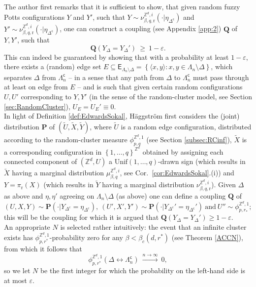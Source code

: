 \documentclass[12pt]{article}
\newcommand{\E}{\mathsf{E}}
\newcommand{\PP}{\mathbf{P}}
\newcommand{\Q}{\mathbf{Q}}
\renewcommand{\r}{\mathrm{r}}
\newcommand{\Z}{\mathbb{Z}}
\newcommand{\set}[1]{\left\{#1\right\}}
\newcommand{\ra}{\rightarrow}
\newcommand{\pika}{\boldsymbol{\cdot}}
\newcommand{\1}{\mathbbm{1}}
\renewcommand{\sp}[1]{\langle #1\rangle}
\renewcommand{\c}{\mathsf{c}}
\newcommand{\5}{\vspace{0.5cm}}
\renewcommand{\tilde}{\widetilde}
\theoremstyle{definition}
\begin{document}
The author first remarks that it is sufficient to show, that given random fuzzy Potts configurations $Y$ and $Y'$, such that $Y\sim\nu_{\beta,q,\r}^{\Z^d,i}(\pika|\eta_{\Delta^\c})$ and $Y'\sim\nu_{\beta,q,\r}^{\Z^d,i}(\pika|\eta_{\Delta^\c})$, one can construct a coupling (see Appendix \ref{app:2}) $\Q$ of $Y,Y'$, such that
$$\Q(Y_{\Delta}=Y_{\Delta}') ~\geq~ 1-\varepsilon.$$
This can indeed be guaranteed by showing that with a probability at least $1-\varepsilon$, there exists a (random) edge set $E\subseteq\E_{\Lambda_n\setminus\Delta}=\set{\sp{x,y}:x,y\in\Lambda_n\setminus\Delta}$, which separates $\Delta$ from $\Lambda_n^\c$ -- in a sense that any path from $\Delta$ to $\Lambda_n^\c$ must pass through at least on edge from $E$ -- and is such that given certain random configurations $U,U'$ corresponding to $Y,Y'$ (in the sense of the random-cluster model, see Section \ref{sec:RandomCluster}), $U_E=U_E'\equiv 0$. \\

In light of Definition \ref{def:EdwardsSokal}, H\"aggstr\"om first considers the (joint) distribution $\PP$ of $(\tilde{U},\tilde{X},\tilde{Y})$, where $\tilde{U}$ is a random edge configuration, distributed according to the random-cluster measure $\phi_{p,q}^{\Z^d,1}$ (see Section \ref{subsec:RCinf}), $\tilde{X}$ is a corresponding configuration in $\set{1,\ldots,q}^{\Z^d}$ obtained by assigning each connected component of $(\Z^d,U)$ a $\mathrm{Unif}(1,\ldots,q)$-drawn sign (which results in $\tilde{X}$ having a marginal distribution $\mu_{\beta,q}^{\Z^d, i}$, see Cor.~\ref{cor:EdwardsSokal}.(i)) and $Y=\pi_\r(X)$ (which results in $\tilde{Y}$ having a marginal distribution $\nu_{\beta,q,\r}^{\Z^d,i}$). Given $\Delta$ as above and $\eta,\eta'$ agreeing on $\Lambda_n\setminus\Delta$ (as above) one can define a coupling $\Q$ of 
$$(U,X,Y)\sim\PP(\pika|Y_{\Delta^c}=\eta_{\Delta^c}),~(U',X',Y')\sim\PP(\pika|Y_{\Delta^c}'=\eta_{\Delta^\c}')~\text{and}~U''\sim\phi_{p,r_*}^{\Z^d,1};$$
this will be the coupling for which it is argued that $\Q(Y_{\Delta}=Y_{\Delta}')\geq 1-\varepsilon$. \\

An appropriate $N$ is selected rather intuitively: the event that an infinite cluster exists has $\phi_{p,r^*}^{\Z^d,1}$-probability zero for any $\beta<\beta_c(d,r^*)$ (see Theorem \ref{ACCN}), from which it follows that
$$\phi_{p,r^*}^{\Z^d,1}(\Delta\leftrightarrow\Lambda_n^\c) ~\xrightarrow{n\ra\infty}~ 0,$$
so we let $N$ be the first integer for which the probability on the left-hand side is at most $\varepsilon$. \\
\end{document}
